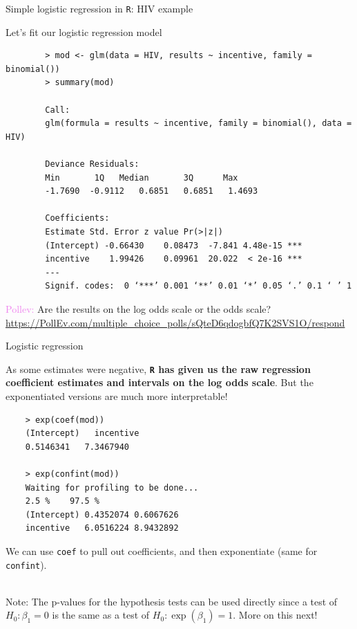 \documentclass[10pt,t]{beamer}
\begin{document}
\begin{frame}[fragile]{Simple logistic regression in \texttt{R}: HIV example}
	\vspace{-0.5cm}
	
	Let's fit our logistic regression model 
	\footnotesize
	
	\begin{verbatim}
		> mod <- glm(data = HIV, results ~ incentive, family = binomial())
		> summary(mod)
		
		Call:
		glm(formula = results ~ incentive, family = binomial(), data = HIV)
		
		Deviance Residuals: 
		Min       1Q   Median       3Q      Max  
		-1.7690  -0.9112   0.6851   0.6851   1.4693  
		
		Coefficients:
		Estimate Std. Error z value Pr(>|z|)    
		(Intercept) -0.66430    0.08473  -7.841 4.48e-15 ***
		incentive    1.99426    0.09961  20.022  < 2e-16 ***
		---
		Signif. codes:  0 ‘***’ 0.001 ‘**’ 0.01 ‘*’ 0.05 ‘.’ 0.1 ‘ ’ 1
	\end{verbatim}
	\normalsize
	
	\textcolor{violet}{Pollev:} Are the results on the log odds scale or the odds scale? 
	\tiny{\url{https://PollEv.com/multiple_choice_polls/sQteD6qdogbfQ7K2SVS1O/respond}}
	
	
\end{frame}

\begin{frame}[fragile]{Logistic regression}
	\vspace{-5 mm}
	
	As some estimates were negative, \textbf{\texttt{R} has given us the raw regression coefficient estimates and intervals on the log odds scale}. But the exponentiated versions are much more interpretable!
	\medskip
	\small
	\begin{verbatim}
	> exp(coef(mod))
	(Intercept)   incentive 
	0.5146341   7.3467940 
	
	> exp(confint(mod))
	Waiting for profiling to be done...
	2.5 %    97.5 %
	(Intercept) 0.4352074 0.6067626
	incentive   6.0516224 8.9432892
	\end{verbatim}
	\normalsize
	
	\medskip
	We can use \texttt{coef} to pull out coefficients, and then exponentiate (same for \texttt{confint}). 
	\\ ~\ 
	
	Note: The p-values for the hypothesis tests can be used directly since a test of $H_0: \beta_1 = 0$ is the same as a test of $H_0: \exp(\beta_1) = 1$. More on this next!
\end{frame}
\end{document}
